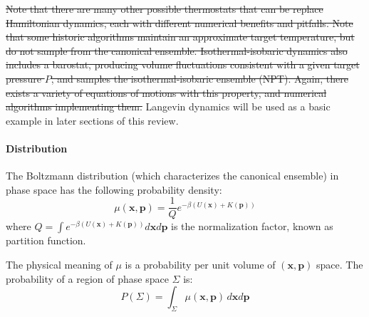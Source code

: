 \documentclass[9pt,review]{livecoms}
\newcommand{\vx}{\mathbf{x}}
\newcommand{\vp}{\mathbf{p}}
\providecommand{\DIFdeltex}[1]{{\protect\color{red}\sout{#1}}}                      %
\providecommand{\DIFdelbegin}{} %
\providecommand{\DIFdelend}{} %
\providecommand{\DIFdel}[1]{\texorpdfstring{\DIFdeltex{#1}}{}} %
\newcommand{\DIFscaledelfig}{0.5}
\newlength{\DIFdelgraphicswidth} %
\newlength{\DIFdelgraphicsheight} %
\newcommand{\DIFdelincludegraphics}[2][]{%
\sbox{\DIFdelgraphicsbox}{\DIFOincludegraphics[#1]{#2}}%
\settoboxwidth{\DIFdelgraphicswidth}{\DIFdelgraphicsbox} %
\settoboxtotalheight{\DIFdelgraphicsheight}{\DIFdelgraphicsbox} %
\scalebox{\DIFscaledelfig}{%
\parbox[b]{\DIFdelgraphicswidth}{\usebox{\DIFdelgraphicsbox}\\[-\baselineskip] \rule{\DIFdelgraphicswidth}{0em}}\llap{\resizebox{\DIFdelgraphicswidth}{\DIFdelgraphicsheight}{%
\setlength{\unitlength}{\DIFdelgraphicswidth}%
\begin{picture}(1,1)%
\thicklines\linethickness{2pt} %
{\color[rgb]{1,0,0}\put(0,0){\framebox(1,1){}}}%
{\color[rgb]{1,0,0}\put(0,0){\line( 1,1){1}}}%
{\color[rgb]{1,0,0}\put(0,1){\line(1,-1){1}}}%
\end{picture}%
}\hspace*{3pt}}} %
} %
\DeclareRobustCommand{\DIFdelbegin}{\DIFOdelbegin \let\includegraphics\DIFdelincludegraphics} %
\DeclareRobustCommand{\DIFdelend}{\DIFOaddend \let\includegraphics\DIFOincludegraphics} %
\begin{document}
\DIFdelbegin \DIFdel{Note that there are many other possible thermostats that can be replace Hamiltonian dynamics, each with different numerical benefits and pitfalls. Note that some historic algorithms maintain an approximate target temperature, but do not sample from the canonical ensemble.
Isothermal-isobaric dynamics also includes a barostat, producing volume fluctuations consistent with a given target pressure $P$, and samples the isothermal-isobaric ensemble (NPT).
Again, there exists a variety of equations of motions with this property, and numerical algorithms implementing them. }\DIFdelend %
Langevin dynamics will be used as a basic example in later sections of this review.

\hypertarget{ref:Distribution}{\paragraph{Distribution}}

The Boltzmann distribution (which characterizes the canonical ensemble) in phase space has the following probability density:
\begin{equation}
\mu(\vx, \vp) = \frac{1}{Q} e^{-\beta (U(\vx) + K(\vp))}
\label{eq:BoltzmannDistr}
\end{equation}
where $ \displaystyle Q = \int e^{-\beta (U(\vx) + K(\vp))} d\vx d\vp$ is the normalization factor, known as partition function.

The physical meaning of $\mu$ is a probability per unit volume of $(\vx, \vp)$ space. The probability of a region of phase space $\Sigma$ is:
\begin{equation}
    P(\Sigma) = \int_\Sigma \mu(\vx, \vp) \, d\vx d\vp
\end{equation}
\end{document}
